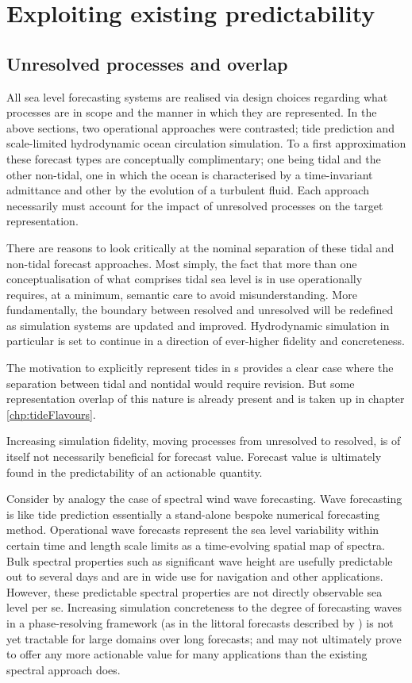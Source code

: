 \section{Exploiting existing predictability}
\label{sec:exploitingPredictability}
\subsection{Unresolved processes and overlap}
All sea level forecasting systems are realised via design choices regarding what processes are in scope and the manner in which they are represented.
In the above sections, two operational approaches were contrasted; tide prediction and scale-limited hydrodynamic ocean circulation simulation.
To a first approximation these forecast types are conceptually complimentary; one being tidal and the other non-tidal, one in which the ocean is characterised by a time-invariant admittance and other by the evolution of a turbulent fluid. 
Each approach necessarily must account for the impact of unresolved processes on the target representation.


There are reasons to look critically at the nominal separation of these tidal and non-tidal forecast approaches.
Most simply, the fact that more than one conceptualisation of what comprises tidal sea level is in use operationally requires, at a minimum, semantic care to avoid misunderstanding.
More fundamentally, the boundary between resolved and unresolved will be redefined as simulation systems are updated and improved.  Hydrodynamic simulation in particular is set to continue in a direction of ever-higher fidelity and concreteness.

The motivation to explicitly represent tides in \OGCM{}s provides a clear case where the separation between tidal and nontidal would require revision.   
But some representation overlap of this nature is already present and is taken up in chapter \ref{chp:tideFlavours}.


Increasing simulation fidelity, moving processes from unresolved to resolved, is of itself not necessarily beneficial for forecast value.
Forecast value is ultimately found in the predictability of an actionable quantity.  


Consider by analogy the case of spectral wind wave forecasting. 
Wave forecasting is like tide prediction essentially a stand-alone bespoke numerical forecasting method.   Operational wave forecasts represent the sea level variability within certain time and length scale limits as a time-evolving spatial map of spectra. Bulk spectral properties such as significant wave height are usefully predictable out to several days and are in wide use for navigation and other applications.   However, these predictable spectral properties are not directly observable sea level per se.   Increasing simulation concreteness to the degree of forecasting waves in a phase-resolving framework (as in the littoral forecasts described by \citep{10.1080/1755876x.2019.1685834}) is not yet tractable for large domains over long forecasts; and may not ultimately prove to offer any more actionable value for many applications than the existing spectral approach does.



